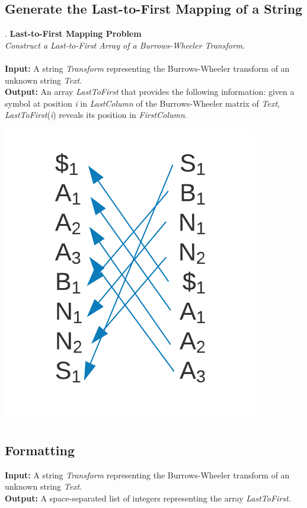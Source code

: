 \documentclass{article}
\begin{document}
\subsection{Generate the Last-to-First Mapping of a String}.
\hline\vspace{5}
\noindent\textbf{Last-to-First Mapping Problem}\\
\emph{Construct a Last-to-First Array of a Burrows-Wheeler Transform}.\\ \\
\textbf{Input:} A string \emph{Transform} representing the Burrows-Wheeler transform of an unknown string \emph{Text}. \\
\textbf{Output:} An array \emph{LastToFirst} that provides the following information: given a symbol at position \emph{i} in \emph{LastColumn} of the Burrows-Wheeler matrix of \emph{Text}, \emph{LastToFirst}(\emph{i}) reveals its position in \emph{FirstColumn}.
\begin{center}
    \includegraphics[scale=0.2]{logos/9K.png} 
\end{center}
\hline\vspace{5}

\subsection*{Formatting}
\textbf{Input:} A string \emph{Transform} representing the Burrows-Wheeler transform of an unknown string \emph{Text}.\\
\noindent\textbf{Output:} A space-separated list of integers representing the array \emph{LastToFirst}.
\end{document}
